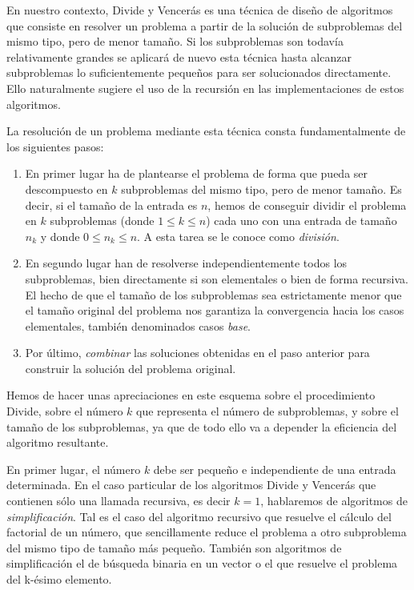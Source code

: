 En nuestro contexto, Divide y Vencerás es una técnica de diseño de algoritmos
que consiste en resolver un problema a partir de la solución de subproblemas del
mismo tipo, pero de menor tamaño. Si los subproblemas son todavía relativamente
grandes se aplicará de nuevo esta técnica hasta alcanzar subproblemas lo
suficientemente pequeños para ser solucionados directamente. Ello naturalmente
sugiere el uso de la recursión en las implementaciones de estos algoritmos.

La resolución de un problema mediante esta técnica consta fundamentalmente
de los siguientes pasos:

\begin{enumerate}
	\item En primer lugar ha de plantearse el problema de forma que pueda ser
	descompuesto en $k$ subproblemas del mismo tipo, pero de menor tamaño. Es
	decir, si el tamaño de la entrada es $n$, hemos de conseguir dividir el problema en
	$k$ subproblemas (donde $1 \le  k \le n$) cada uno con una entrada de tamaño $n_k$ y
	donde $0 \le n_k \le n$. A esta tarea se le conoce como \emph{división}.
	\item En segundo lugar han de resolverse independientemente todos los
	subproblemas, bien directamente si son elementales o bien de forma recursiva.
	El hecho de que el tamaño de los subproblemas sea estrictamente menor que el
	tamaño original del problema nos garantiza la convergencia hacia los casos
	elementales, también denominados casos \emph{base}.
	\item Por último, \emph{combinar} las soluciones obtenidas en el paso anterior para construir
	la solución del problema original.
\end{enumerate}

Hemos de hacer unas apreciaciones en este esquema sobre el procedimiento
Divide, sobre el número $k$ que representa el número de subproblemas, y sobre el
tamaño de los subproblemas, ya que de todo ello va a depender la eficiencia del
algoritmo resultante.

En primer lugar, el número $k$ debe ser pequeño e independiente de una entrada
determinada. En el caso particular de los algoritmos Divide y Vencerás que
contienen sólo una llamada recursiva, es decir $k = 1$, hablaremos de algoritmos de
\emph{simplificación}. Tal es el caso del algoritmo recursivo que resuelve el cálculo del
factorial de un número, que sencillamente reduce el problema a otro subproblema
del mismo tipo de tamaño más pequeño. También son algoritmos de simplificación
el de búsqueda binaria en un vector o el que resuelve el problema del k-ésimo
elemento.

